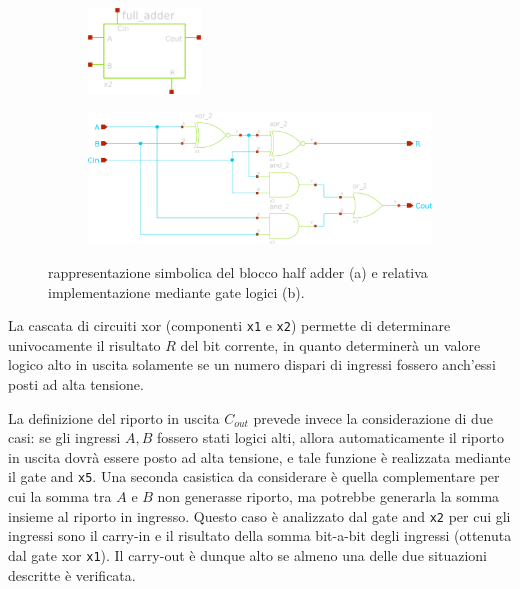 	\begin{figure}[bht]
		\centering
		\begin{subfigure}{0.48\linewidth}
			\centering
			\includegraphics[width=3cm]{Immagini/full-adder-sch}
			\caption{}
		\end{subfigure}
		\begin{subfigure}{0.48\linewidth}
			\centering
			\includegraphics[width=\linewidth]{Immagini/full-adder}
			\caption{}
		\end{subfigure}
		\caption{rappresentazione simbolica del blocco half adder (a) e relativa implementazione mediante gate logici (b).}
		\label{fig:fa:sch}
	\end{figure}
	
	La cascata di circuiti xor (componenti \texttt{x1} e \texttt{x2}) permette di determinare univocamente il risultato $R$ del bit corrente, in quanto determinerà un valore logico alto in uscita solamente se un numero dispari di ingressi fossero anch'essi posti ad alta tensione.
	
	La definizione del riporto in uscita $C_{out}$ prevede invece la considerazione di due casi: se gli ingressi $A,B$ fossero stati logici alti, allora automaticamente il riporto in uscita dovrà essere posto ad alta tensione, e tale funzione è realizzata mediante il gate and \texttt{x5}. Una seconda casistica da considerare è quella complementare per cui la somma tra $A$ e $B$ non generasse riporto, ma potrebbe generarla la somma insieme al riporto in ingresso. Questo caso è analizzato dal gate and \texttt{x2} per cui gli ingressi sono il carry-in e il risultato della somma bit-a-bit degli ingressi (ottenuta dal gate xor \texttt{x1}). Il carry-out è dunque alto se almeno una delle due situazioni descritte è verificata.
	

